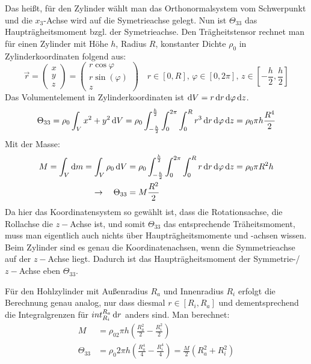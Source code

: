 Das heißt, für den Zylinder wählt man das Orthonormalsystem vom Schwerpunkt und die \(x_3\)-Achse wird auf die Symetrieachse gelegt. Nun ist \(\Theta_{33}\) das Haupträgheitsmoment bzgl. der Symetrieachse. Den Trägheitstensor rechnet man für einen Zylinder mit Höhe \(h\), Radius \(R\), konstanter Dichte \(\rho_0\) in Zylinderkoordinaten folgend aus:
\begin{equation} \vec{r}=\begin{pmatrix}
x \\
y \\
z
\end{pmatrix}=
   \begin{pmatrix}
r \cos{\varphi}\\
r\sin(\varphi)\\
z
\end{pmatrix}\quad r\in [0,R],\,\varphi\in[0,2\pi],\,z\in\left[-\frac{h}{2},\frac{h}{2}\right]
\end{equation} 
Das Volumentelement in Zylinderkoordinaten ist \(\mathop{}\!\mathrm{d} V=r\mathop{}\!\mathrm{d} r \mathop{}\!\mathrm{d} \varphi \mathop{}\!\mathrm{d} z\). 
\begin{equation}
    \Theta_{33}=\rho_0 \int_V x^2+y^2 \mathop{}\!\mathrm{d} V= \rho_0\int_{-\frac{h}{2}}^{\frac{h}{2}}\int_{0}^{2\pi}\int_{0}^{R} r^3\mathop{}\!\mathrm{d} r \mathop{}\!\mathrm{d} \varphi \mathop{}\!\mathrm{d} z=\rho_0\pi h \frac{R^4}{2}
\end{equation}
Mit der Masse:
\begin{align}
M=\int_V\mathop{}\!\mathrm{d} m=\int_V\rho_0 \mathop{}\!\mathrm{d} V&=\rho_0\int_{-\frac{h}{2}}^{\frac{h}{2}}\int_{0}^{2\pi}\int_{0}^{R} r \mathop{}\!\mathrm{d} r \mathop{}\!\mathrm{d} \varphi \mathop{}\!\mathrm{d} z=\rho_0 \pi R^2 h \nonumber\\ 
\rightarrow \quad \Theta_{33}&=M \frac{R^2}{2}
    \label{eq:traegheit_voll}
\end{align}
Da hier das Koordinatensystem so gewählt ist, dass die Rotationsachse, die Rollachse die \(z-\)Achse ist, und somit \(\Theta_{33}\) das entsprechende Träheitsmoment, muss man eigentlich auch nichts über Haupträgheitsmomente und -achsen wissen. Beim Zylinder sind es genau die Koordinatenachsen, wenn die Symmetrieachse auf der \(z-\)Achse liegt. Dadurch ist das Haupträgheitsmoment der Symmetrie-/\(z-\)Achse eben \(\Theta_{33}\).

Für den Hohlzylinder mit Außenradius \(R_a\) und Innenradius \(R_i\) erfolgt die Berechnung genau analog, nur dass diesmal \(r\in[R_i,R_a]\) und dementsprechend die Integralgrenzen für \(int_{R_i}^{R_a}\mathop{}\!\mathrm{d} r\) anders sind. Man berechnet:
\begin{align}
    M&=\rho_02\pi h(\frac{R_a^2}{2}-\frac{R_i^2}{2})\nonumber\\
    \Theta_{33}&=\rho_0 2\pi h \left(\frac{R_a^4}{4}-\frac{R_i^4}{4}\right)=\frac{M}{2}(R_a^2+R_i^2)
        \label{eq:traegheit_hohl}
\end{align}

